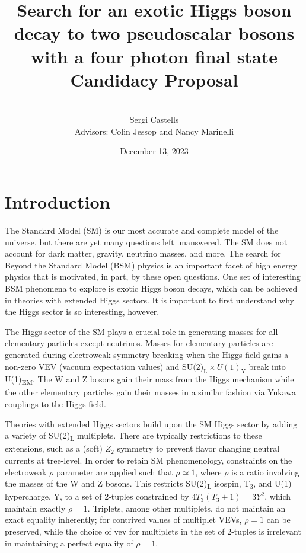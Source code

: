 \documentclass[12pt]{article}
\title{
    Search for an exotic Higgs boson decay to two pseudoscalar bosons with a four photon final state\\[0.2cm]
    \Large Candidacy Proposal
}
\author{\\[0.25cm]Sergi Castells\\[0.25cm] Advisors: Colin Jessop and Nancy Marinelli\\[0.75cm]}
\date{December 13, 2023}
\begin{document}
\maketitle
\linenumbers

\section{Introduction}
The Standard Model (SM) is our most accurate and complete model of the universe, but there are yet many questions left unanswered. The SM does not account for dark matter, gravity, neutrino masses, and more. The search for Beyond the Standard Model (BSM) physics is an important facet of high energy physics that is motivated, in part, by these open questions. One set of interesting BSM phenomena to explore is exotic Higgs boson decays, which can be achieved in theories with extended Higgs sectors. It is important to first understand why the Higgs sector is so interesting, however.\par

The Higgs sector of the SM plays a crucial role in generating masses for all elementary particles except neutrinos. Masses for elementary particles are generated during electroweak symmetry breaking when the Higgs field gains a non-zero VEV (vacuum expectation values) and $\text{SU(2)}_\text{L} \times U(1)_\text{Y}$ break into U(1)\textsubscript{EM}. The W and Z bosons gain their mass from the Higgs mechanism while the other elementary particles gain their masses in a similar fashion via Yukawa couplings to the Higgs field.\par

Theories with extended Higgs sectors build upon the SM Higgs sector by adding a variety of SU(2)\textsubscript{L} multiplets. There are typically restrictions to these extensions, such as a (soft) $Z_2$ symmetry to prevent flavor changing neutral currents at tree-level. In order to retain SM phenomenology, constraints on the electroweak $\rho$ parameter are applied such that $\rho \simeq 1$, where $\rho$ is a ratio involving the masses of the W and Z bosons. This restricts SU(2)\textsubscript{L} isospin, T\textsubscript{3}, and U(1) hypercharge, Y, to a set of 2-tuples constrained by $4T_3(T_3 + 1) = 3Y^2$, which maintain exactly $\rho = 1$. Triplets, among other multiplets, do not maintain an exact equality inherently; for contrived values of multiplet VEVs, $\rho = 1$ can be preserved, while the choice of vev for multiplets in the set of 2-tuples is irrelevant in maintaining a perfect equality of $\rho = 1$.\par
\end{document}
